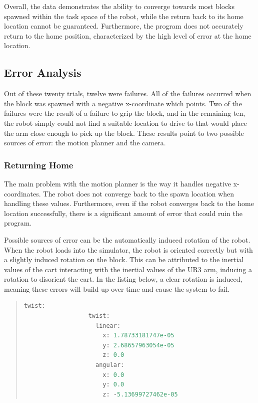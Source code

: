         Overall, the data demonstrates the ability to converge towards most blocks spawned within the task space of the robot, while the return back to its home location cannot be guaranteed. Furthermore, the program does not accurately return to the home position, characterized by the high level of error at the home location. 
    
    \subsection{Error Analysis} %
    
        Out of these twenty trials, twelve were failures. All of the failures occurred when the block was spawned with a negative x-coordinate which points. Two of the failures were the result of a failure to grip the block, and in the remaining ten, the robot simply could not find a suitable location to drive to that would place the arm close enough to pick up the block. These results point to two possible sources of error: the motion planner and the camera.
        
        \subsubsection*{Returning Home}
            
            The main problem with the motion planner is the way it handles negative x-coordinates. The robot does not converge back to the spawn location when handling these values. Furthermore, even if the robot converges back to the home location successfully, there is a significant amount of error that could ruin the program. 
            
            Possible sources of error can be the automatically induced rotation of the robot. When the robot loads into the simulator, the robot is oriented correctly but with a slightly induced rotation on the block. This can be attributed to the inertial values of the cart interacting with the inertial values of the UR3 arm, inducing a rotation to disorient the cart. In the listing below, a clear rotation is induced, meaning these errors will build up over time and cause the system to fail. 
            
            \begin{quote} 
                \begin{lstlisting}[gobble=16,language=Python]
                twist: 
                  twist: 
                    linear: 
                      x: 1.78733181747e-05
                      y: 2.68657963054e-05
                      z: 0.0
                    angular: 
                      x: 0.0
                      y: 0.0
                      z: -5.13699727462e-05
                \end{lstlisting}
            \end{quote}
            
